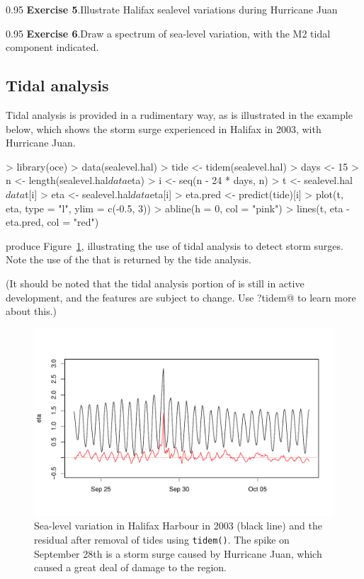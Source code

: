\documentclass{article}
\newcommand{\workedexercise}[2]{
	\vspace{2ex plus 2ex minus 1ex}
	\begin{boxedminipage}[c]{0.95\linewidth}
		{\textbf{Exercise #1}.\hspace{1em}#2}
	\end{boxedminipage}
	\vspace{2ex plus 2ex minus 1ex}
}
\begin{document}
\workedexercise{5}{Illustrate Halifax sealevel variations during Hurricane Juan}

\workedexercise{6}{Draw a spectrum of sea-level variation, with the M2 tidal component indicated.}

\subsection{Tidal analysis}

Tidal analysis is provided in a rudimentary way, as is illustrated in the
example below, which shows the storm surge experienced in Halifax in 2003, with
Hurricane Juan.


\begin{Schunk}
\begin{Sinput}
> library(oce)
> data(sealevel.hal)
> tide <- tidem(sealevel.hal)
> days <- 15
> n <- length(sealevel.hal$data$eta)
> i <- seq(n - 24 * days, n)
> t <- sealevel.hal$data$t[i]
> eta <- sealevel.hal$data$eta[i]
> eta.pred <- predict(tide)[i]
> plot(t, eta, type = "l", ylim = c(-0.5, 3))
> abline(h = 0, col = "pink")
> lines(t, eta - eta.pred, col = "red")
\end{Sinput}
\end{Schunk}
produce Figure~\ref{fig:tide}, illustrating the use of tidal analysis to detect
storm surges.  Note the use of the \verb@model@ that is returned by the tide
analysis.

(It should be noted that the tidal analysis portion of \verb@oce@ is still in
active development, and the features are subject to change.  Use
\verb@?tidem@ to learn more about this.)

\begin{figure}
	\begin{center}
\includegraphics{oce-tidefig}
\end{center}
\caption{Sea-level variation in Halifax Harbour in 2003 (black line) and the residual
after removal of tides using \texttt{tidem()}.  The spike on September 28th
is a storm surge caused by Hurricane Juan, which caused a great deal of damage
to the region.}
\label{fig:tide}
\end{figure}
\end{document}
